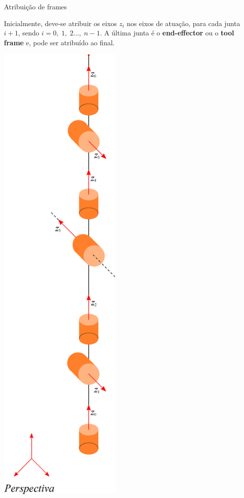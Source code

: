 \documentclass[aspectratio=169]{beamer}
\begin{document}
\begin{frame}{Atribuição de frames}
\begin{minipage}{0.7\textwidth}
    Inicialmente, deve-se atribuir os eixos $z_i$ nos eixos de atuação, para cada junta $i+1$, sendo $i = 0,\;1,\;2\dots,\;n-1$. A última junta é o \textbf{end-effector} ou o \textbf{tool frame} e, pode ser atribuído ao final.
\end{minipage}\hfill
\begin{minipage}{0.28\textwidth}
    \includegraphics[width=0.45\textwidth]{Fig/z.eps}
\end{minipage}
\end{frame}
\end{document}
